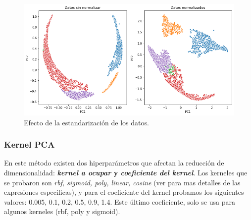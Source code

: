 \documentclass[paper=letter, fontsize=11pt]{scrartcl}
\numberwithin{equation}{section} %
\numberwithin{figure}{section} %
\numberwithin{table}{section} %
\begin{document}
\begin{figure}[H]
    \centering
    \includegraphics[scale=0.35]{figure/tunning_pca.png}
    \caption{Efecto de la estandarización de los datos.}
    \label{fig:tunning_pca}
\end{figure}

\subsubsection*{Kernel PCA}
En este método existen dos hiperparámetros que afectan la reducción de dimensionalidad: \textbf{\textit{kernel a ocupar} y \textit{coeficiente del kernel}}. Los kerneles que se probaron son \textit{rbf, sigmoid, poly, linear, cosine} (ver \cite{scikit-learn} para mas detalles de las expresiones especificas), y para el coeficiente del kernel probamos los siguientes valores: 0.005, 0.1, 0.2, 0.5, 0.9, 1.4. Este último coeficiente, solo se usa para algunos kerneles (rbf, poly y sigmoid). \\
\end{document}
